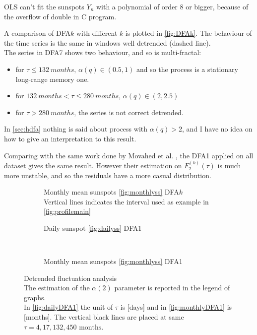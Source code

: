 OLS can't fit the sunspots $Y_n$ with a polynomial of order 8 or bigger, because of the overflow of double in C program.

A comparison of DFA$k$ with different $k$ is plotted in \autoref{fig:DFAk}. 
The behaviour of the time series is the same in windows well detrended (dashed line).\\ 
The series in DFA7 shows two behaviour, and so is multi-fractal:
\begin{itemize}
	\item for $\tau \le \SI{132}{months}$, $\alpha(q) \in (0.5, 1)$ and so the process is a stationary long-range memory one.
	\item for $\SI{132}{months} < \tau \le \SI{280}{months}$, $\alpha(q) \in (2, 2.5)$ 
	\item for $\tau > \SI{280}{months}$, the series is not correct detrended.
\end{itemize}

In \autoref{sec:hdfa} nothing is said about process with $\alpha(q)>2$, and I have no idea on how to give an interpretation to this result. 

Comparing with the same work done by Movahed et al. \cite{Movahed_2006}, the DFA1 applied on all dataset gives the same result. However their estimation on $F_2^{( k )}(\tau)$ is much more unstable, and so the residuals have a more casual distribution.

\begin{figure}[!h]
	\centering
	\begin{subfigure}{\textwidth}
		
		\caption{Monthly mean sunspots \ref{fig:monthlyss} DFA$k$\\ Vertical lines indicates the interval used as example in \autoref{fig:profilemain}}\label{fig:DFAk}
	\end{subfigure}

	\begin{subfigure}{0.48\textwidth}
		
		\caption{Daily sunspot \ref{fig:dailyss} DFA1}\label{fig:dailyDFA1}
	\end{subfigure}
	~
	\begin{subfigure}{0.48\textwidth}
		
		\caption{Monthly mean sunspots \ref{fig:monthlyss} DFA1}\label{fig:monthlyDFA1}
	\end{subfigure}
	\caption{Detrended fluctuation analysis\\
	The estimation of the $\alpha(2)$ parameter is reported in the legend of graphs.\\
	In \autoref{fig:dailyDFA1} the unit of $\tau$ is [days] and in \autoref{fig:monthlyDFA1} is [months]. The vertical black lines are placed at same $\tau = 4,17, 132, 450 \text{ months}$.}\label{fig:DFA}
\end{figure}

